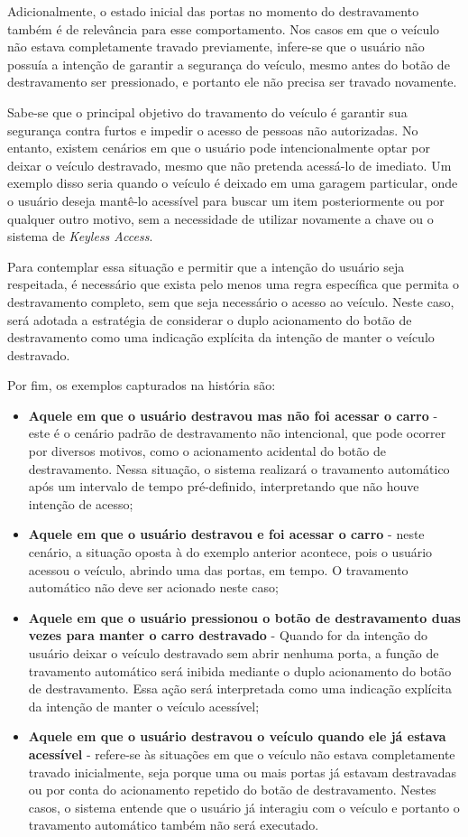 Adicionalmente, o estado inicial das portas no momento do destravamento também é de relevância para esse comportamento. Nos casos em que o veículo não estava 
completamente travado previamente, infere-se que o usuário não possuía a intenção de garantir a segurança do veículo, mesmo antes do botão de destravamento ser 
pressionado, e portanto ele não precisa ser travado novamente.

Sabe-se que o principal objetivo do travamento do veículo é garantir sua segurança contra furtos e impedir o acesso de pessoas não autorizadas. No entanto, existem 
cenários em que o usuário pode intencionalmente optar por deixar o veículo destravado, mesmo que não pretenda acessá-lo de imediato. Um exemplo disso seria quando 
o veículo é deixado em uma garagem particular, onde o usuário deseja mantê-lo acessível para buscar um item posteriormente ou por qualquer outro motivo, sem a 
necessidade de utilizar novamente a chave ou o sistema de \textit{Keyless Access}.

Para contemplar essa situação e permitir que a intenção do usuário seja respeitada, é necessário que exista pelo menos uma regra específica que permita o 
destravamento completo, sem que seja necessário o acesso ao veículo. Neste caso, será adotada a estratégia de considerar o duplo acionamento do botão de 
destravamento como uma indicação explícita da intenção de manter o veículo destravado. 

Por fim, os exemplos capturados na história são:

\begin{itemize}
    \item \textbf{Aquele em que o usuário destravou mas não foi acessar o carro} - este é o cenário padrão de destravamento não intencional, que pode ocorrer por diversos motivos, como o acionamento acidental do botão de destravamento. Nessa situação, o sistema realizará o travamento automático após um intervalo de tempo pré-definido, interpretando que não houve intenção de acesso;
    \item \textbf{Aquele em que o usuário destravou e foi acessar o carro} - neste cenário, a situação oposta à do exemplo anterior acontece, pois o usuário acessou o veículo, abrindo uma das portas, em tempo. O travamento automático não deve ser acionado neste caso;
    \item \textbf{Aquele em que o usuário pressionou o botão de destravamento duas vezes para manter o carro destravado} - Quando for da intenção do usuário deixar o veículo destravado sem abrir nenhuma porta, a função de travamento automático será inibida mediante o duplo acionamento do botão de destravamento. Essa ação será interpretada como uma indicação explícita da intenção de manter o veículo acessível;
    \item \textbf{Aquele em que o usuário destravou o veículo quando ele já estava acessível} - refere-se às situações em que o veículo não estava completamente travado inicialmente, seja porque uma ou mais portas já estavam destravadas ou por conta do acionamento repetido do botão de destravamento. Nestes casos, o sistema entende que o usuário já interagiu com o veículo e portanto o travamento automático também não será executado.
\end{itemize}

